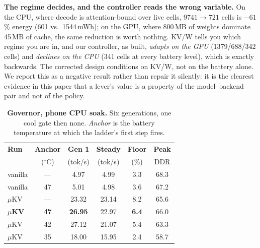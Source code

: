 \documentclass[sigconf,10pt]{acmart}
\begin{document}
\textbf{The regime decides, and the controller reads the wrong variable.} On the CPU, where decode is attention-bound over live cells, $9741\!\rightarrow\!721$ cells is $-61$\% energy (601 vs.\ 1544\,mWh); on the GPU, where 800\,MB of weights dominate 45\,MB of cache, the same reduction is worth nothing. KV/W tells you which regime you are in, and our controller, as built, \emph{adapts on the GPU} (1379/688/342 cells) and \emph{declines on the CPU} (341 cells at every battery level), which is exactly backwards. The corrected design conditions on KV/W, not on the battery alone. We report this as a negative result rather than repair it silently: it is the clearest evidence in this paper that a lever's value is a property of the model--backend pair and not of the policy.

\begin{table}[t]
\caption{\textbf{Governor, phone CPU soak.} Six generations, one cool gate then none. \emph{Anchor} is the battery temperature at which the ladder's first step fires.}
\label{tab:gov}
\small
\setlength{\tabcolsep}{4.5pt}
\begin{tabular}{lccccc}
\toprule
\textbf{Run} & \textbf{Anchor} & \textbf{Gen 1} & \textbf{Steady} & \textbf{Floor} & \textbf{Peak} \\
 & ($^\circ$C) & (tok/s) & (tok/s) & (\%) & DDR \\
\midrule
vanilla          & ---  & 4.97  & 4.99  & 3.3 & 68.3 \\
vanilla          & 47   & 5.01  & 4.98  & 3.6 & 67.2 \\
\midrule
$\mu$KV          & ---  & 23.32 & 23.14 & 8.2 & 65.6 \\
\textbf{$\mu$KV} & \textbf{47} & \textbf{26.95} & 22.97 & \textbf{6.4} & 66.0 \\
$\mu$KV          & 42   & 27.12 & 21.07 & 5.4 & 63.3 \\
$\mu$KV          & 35   & 18.00 & 15.95 & 2.4 & 58.7 \\
\bottomrule
\end{tabular}
\end{table}
\end{document}
